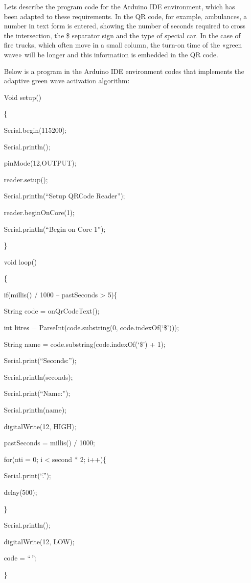 Let\textquotesingle s describe the program code for the Arduino IDE
environment, which has been adapted to these requirements. In the QR
code, for example, ambulances, a number in text form is entered, showing
the number of seconds required to cross the intersection, the \$
separator sign and the type of special car. In the case of fire trucks,
which often move in a small column, the turn-on time of the «green wave»
will be longer and this information is embedded in the QR code.

Below is a program in the Arduino IDE environment codes that implements
the adaptive green wave activation algorithm:

Void setup()

\{

Serial.begin(115200);

Serial.println();

pinMode(12,OUTPUT);

reader.setup();

Serial.println(``Setup QRCode Reader'');

reader.beginOnCore(1);

Serial.println(``Begin on Core 1'');

\}

void loop()

\{

if(millis() / 1000 -- pastSeconds \textgreater{} 5)\{

String code = onQrCodeText();

int litres = ParseInt(code.substring(0, code.indexOf(`\$')));

String name = code.substring(code.indexOf(`\$') + 1);

Serial.print(``Seconds:'');

Serial.println(seconds);

Serial.print(``Name:'');

Serial.println(name);

digitalWrite(12, HIGH);

pastSeconds = millis() / 1000;

for(nti = 0; i \textless{} second * 2; i++)\{

Serial.print(``.'');

delay(500);

\}

Serial.println();

digitalWrite(12, LOW);

code = ``\,'';

\}


